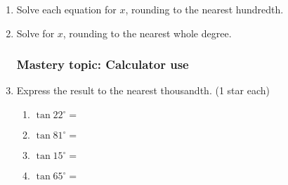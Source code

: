 \documentclass[12pt, twoside]{article}
\begin{document}
\begin{enumerate}
\subsubsection*{Mastery topic: Algebraic solution \hfill (2 stars each)}
\item Solve each equation for $x$, rounding to the nearest hundredth.
  \begin{enumerate}
\end{enumerate}
  \vspace{6cm}
\item Solve for $x$, rounding to the nearest whole degree.
  \begin{enumerate}
\end{enumerate}

\newpage
\subsubsection*{Mastery topic: Calculator use}
  \item Express the result to the nearest thousandth. \hfill (1 star each) \vspace{.5cm}
    \begin{multicols}{2}
      \begin{enumerate}
        \item $\tan 22^\circ = $ \vspace{1cm}
        \item $\tan 81^\circ =$
        \item $\tan 15^\circ = $ \vspace{1cm}
        \item $\tan 65^\circ =$
      \end{enumerate}
    \end{multicols} \vspace{1cm}


\end{enumerate}
\end{document}
